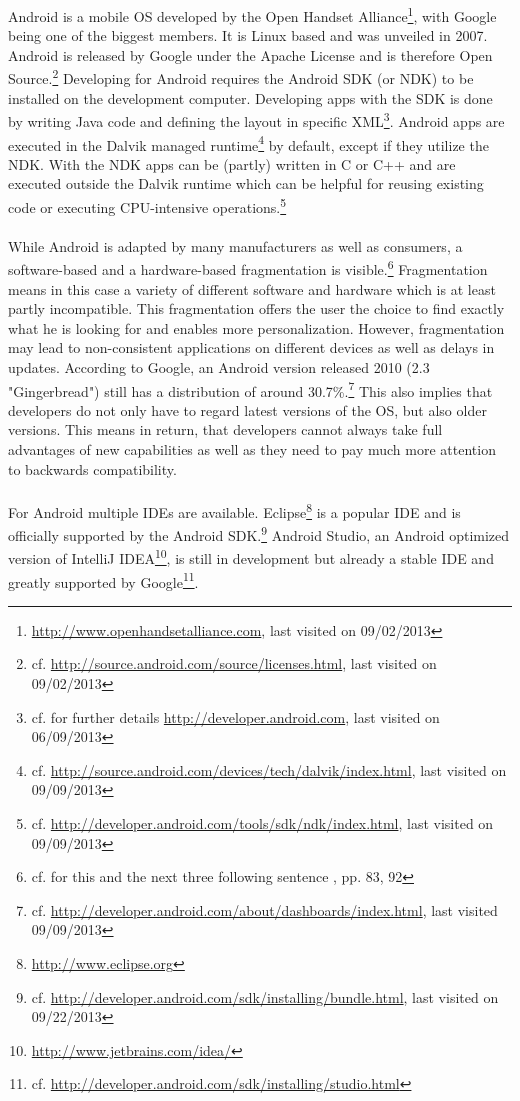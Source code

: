 \vspace{0.75em}
Android is a mobile OS developed by the Open Handset Alliance\footnote{\url{http://www.openhandsetalliance.com}, last visited on 09/02/2013}, with Google being one of the biggest members. It is Linux based and was unveiled in 2007. Android is released by Google under the Apache License and is therefore Open Source.\footnote{cf. \url{http://source.android.com/source/licenses.html}, last visited on 09/02/2013} Developing for Android requires the Android SDK (or NDK) to be installed on the development computer. Developing apps with the SDK is done by writing Java code and defining the layout in specific XML\footnote{cf. for further details \url{http://developer.android.com}, last visited on 06/09/2013}. Android apps are executed in the Dalvik managed runtime\footnote{cf. \url{http://source.android.com/devices/tech/dalvik/index.html}, last visited on 09/09/2013} by default, except if they utilize the NDK. With the NDK apps can be (partly) written in C or C++ and are executed outside the Dalvik runtime which can be helpful for reusing existing code or executing CPU-intensive operations.\footnote{cf. \url{http://developer.android.com/tools/sdk/ndk/index.html}, last visited on 09/09/2013}
\\
\\
While Android is adapted by many manufacturers as well as consumers, a software-based and a hardware-based fragmentation is visible.\footnote{cf. for this and the next three following sentence \cite{DanHan.2012}, pp. 83, 92} Fragmentation means in this case a variety of different software and hardware which is at least partly incompatible. This fragmentation offers the user the choice to find exactly what he is looking for and enables more personalization. However, fragmentation may lead to non-consistent applications on different devices as well as delays in updates. According to Google, an Android version released 2010 (2.3 "Gingerbread") still has a distribution of around 30.7\%.\footnote{cf. \url{http://developer.android.com/about/dashboards/index.html}, last visited 09/09/2013} This also implies that developers do not only have to regard latest versions of the OS, but also older versions. This means in return, that developers cannot always take full advantages of new capabilities as well as they need to pay much more attention to backwards compatibility.
\\
\\
For Android multiple IDEs are available. Eclipse\footnote{\url{http://www.eclipse.org}} is a popular IDE and is officially supported by the Android SDK.\footnote{cf. \url{http://developer.android.com/sdk/installing/bundle.html}, last visited on 09/22/2013} Android Studio, an Android optimized version of IntelliJ IDEA\footnote{\url{http://www.jetbrains.com/idea/}}, is still in development but already a stable IDE and greatly supported by Google\footnote{cf. \url{http://developer.android.com/sdk/installing/studio.html}}.
